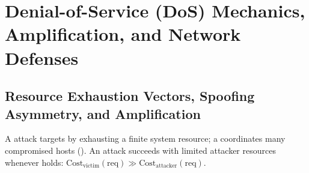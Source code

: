 \section{Denial-of-Service (DoS) Mechanics, Amplification, and Network Defenses}

\subsection{Resource Exhaustion Vectors, Spoofing Asymmetry, and Amplification}
A  attack targets  by exhausting a finite system resource; a  coordinates many compromised hosts (). An attack succeeds with limited attacker resources whenever  holds: $\mathrm{Cost}_{\text{victim}}(\text{req}) \gg \mathrm{Cost}_{\text{attacker}}(\text{req})$.

